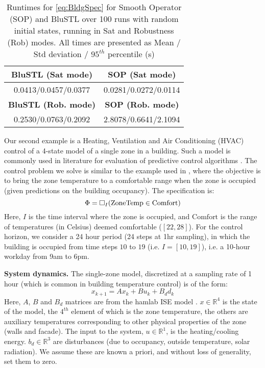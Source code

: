 \begin{table}[t]
	\begin{center}
		\caption{{\small Runtimes for \eqref{eq:BldgSpec} for Smooth Operator (SOP) and BluSTL over 100 runs with random initial states, running in Sat and Robustness (Rob) modes. All times are presented as Mean / Std deviation / $95^{th}$ percentile (s)}}
		\vspace{-5pt}
		\label{tbl:bldg}
		\begin{tabular} {|c|c|}
			\hline
			\textbf{BluSTL (Sat mode)} &   \textbf{SOP (Sat mode)}
			\\ \hline
			0.0413/0.0457/0.0377 & 0.0281/0.0272/0.0114
			\\ \hline
			 \textbf{BluSTL (Rob. mode)} & \textbf{SOP (Rob. mode)}
			\\ \hline
			 0.2530/0.0763/0.2092 & 2.8078/0.6641/2.1094\\ \hline	
		\end{tabular}	
	\end{center}
	\vspace{-10pt}
\end{table}
Our second example is a Heating, Ventilation and Air Conditioning (HVAC) control of a 4-state model of a single zone in a building. 
Such a model is commonly used in literature for evaluation of predictive control algorithms \cite{Jain2016}. 
The control problem we solve is similar to the example used in \cite{Raman14_MPCSTL}, where the objective is to bring the zone temperature to a comfortable range when the zone is occupied (given predictions on the building occupancy). 
The specification is:
\begin{equation}
\label{eq:BldgSpec}
\Phi= \square_I(\text{ZoneTemp} \in \text{Comfort})
\end{equation}
Here, $I$ is the time interval where the zone is occupied, and $\text{Comfort}$ is the range of temperatures (in Celsius) deemed comfortable ($[22,28]$). For the control horizon, we consider a 24 hour period (24 steps at 1hr sampling), in which the building is occupied from time steps $10$ to $19$ (i.e. $I=[10,19]$), i.e. a 10-hour workday from 9am to 6pm. 

\textbf{System dynamics.} The single-zone model, discretized at a sampling rate of 1 hour (which is common in building temperature control) is of the form:
\begin{equation}
\label{eq:bldg_dyn}
x_{k+1} = Ax_{k}+Bu_k+B_dd_k
\end{equation}
Here, $A$, $B$ and $B_d$ matrices are from the hamlab ISE model \cite{VanSchijndel2005}. $x \in \mathbb{R}^4$ is the state of the model, the $4^{th}$ element of which is the zone temperature, the others are auxiliary temperatures corresponding to other physical properties of the zone (walls and facade). 
The input to the system, $u \in \mathbb{R}^1$, is the heating/cooling energy. 
$b_d \in \mathbb{R}^3$ are disturbances (due to occupancy, outside temperature, solar radiation). 
We assume these are known a priori, and without loss of generality, set them to zero.


